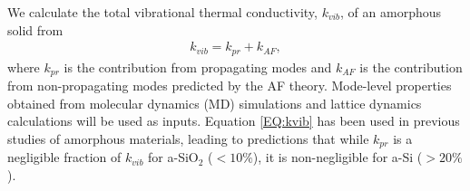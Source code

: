 \documentclass[aps,prb,onecolumn,preprint,superscriptaddress,footinbib,amsmath,amssymb,floatfix]{revtex4}
\begin{document}
We calculate the total vibrational thermal conductivity, $k_{vib}$, 
of an amorphous solid from 
\begin{equation}\label{EQ:kvib}
\begin{split}
k_{vib} = k_{pr} + k_{AF},
\end{split}
\end{equation}
where $k_{pr}$ is the contribution from propagating modes
\cite{ashcroft_solid_1976,dove_introduction_1993,ziman_electrons_2001} 
and $k_{AF}$ is the contribution from non-propagating modes predicted 
by the AF theory.\cite{feldman_thermal_1993} Mode-level 
properties obtained from molecular dynamics (MD) simulations and 
lattice dynamics calculations will be used as inputs. 
Equation \eqref{EQ:kvib} has been used in 
previous studies of amorphous materials,
\cite{graebner_phonon_1986,freeman_thermal_1986,
love_estimate_1990,feldman_thermal_1993,cahill_thermal_1994,
feldman_numerical_1999,baldi_thermal_2008,
liu_high_2009,yang_anomalously_2010} 
leading to predictions that while $k_{pr}$ is a negligible 
fraction of $k_{vib}$ for a-SiO$_2$ ($< 10\%$),
\cite{graebner_phonon_1986,freeman_thermal_1986,
love_estimate_1990,baldi_thermal_2008} 
it is non-negligible 
for a-Si ($> 20\%$).
\cite{feldman_thermal_1993,cahill_thermal_1994,
feldman_numerical_1999,liu_high_2009,yang_anomalously_2010,
he_heat_2011}
\end{document}
